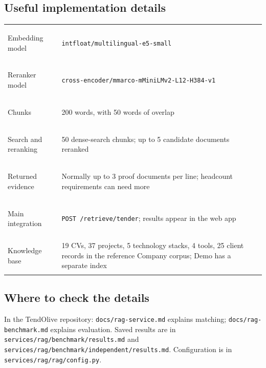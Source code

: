 \documentclass[11pt,a4paper]{article}
\newcommand{\smallref}[1]{{\footnotesize\color{muted}#1}}
\begin{document}
\subsection{Useful implementation details}
{\small
\begin{tabularx}{\textwidth}{@{}>{\bfseries\raggedright\arraybackslash}p{3.4cm}Y@{}}
\toprule
Embedding model & \texttt{intfloat/multilingual-e5-small}\\
Reranker model & \texttt{cross-encoder/mmarco-mMiniLMv2-L12-H384-v1}\\
Chunks & 200 words, with 50 words of overlap\\
Search and reranking & 50 dense-search chunks; up to 5 candidate documents reranked\\
Returned evidence & Normally up to 3 proof documents per line; headcount requirements can need more\\
Main integration & \texttt{POST /retrieve/tender}; results appear in the web app\\
Knowledge base & 19 CVs, 37 projects, 5 technology stacks, 4 tools, 25 client records in the reference Company corpus; Demo has a separate index\\
\bottomrule
\end{tabularx}}

\subsection{Where to check the details}
\smallref{In the TendOlive repository: \texttt{docs/rag-service.md} explains matching; \texttt{docs/rag-benchmark.md} explains evaluation. Saved results are in \texttt{services/rag/benchmark/results.md} and \texttt{services/rag/benchmark/independent/results.md}. Configuration is in \texttt{services/rag/rag/config.py}.}
\end{document}
